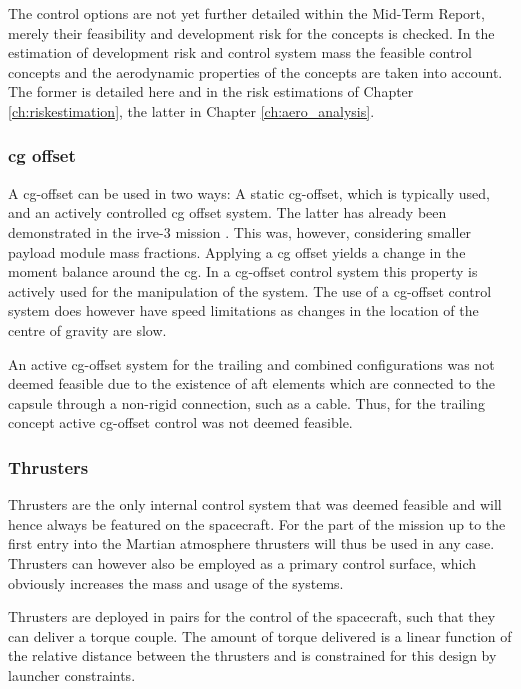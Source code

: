The control options are not yet further detailed within the Mid-Term Report, merely their feasibility and development risk for the concepts is checked. In the estimation of development risk and control system mass the feasible control concepts and the aerodynamic properties of the concepts are taken into account. The former is detailed here and in the risk estimations of Chapter \ref{ch:riskestimation}, the latter in Chapter \ref{ch:aero_analysis}.

\subsubsection{\gls{cg} offset}
A \acrfull{cg}-offset can be used in two ways: A static \gls{cg}-offset, which is typically used, and an actively controlled \gls{cg} offset system. The latter has already been demonstrated in the \gls{irve}-3 mission \cite{Dillman2012}. This was, however, considering smaller payload module mass fractions. Applying a \gls{cg} offset yields a change in the moment balance around the \gls{cg}. In a \gls{cg}-offset control system this property is actively used for the manipulation of the system. The use of a \gls{cg}-offset control system does however have speed limitations as changes in the location of the centre of gravity are slow.

An active \gls{cg}-offset system for the trailing and combined configurations was not deemed feasible due to the existence of aft elements which are connected to the capsule through a non-rigid connection, such as a cable. Thus, for the trailing concept active \gls{cg}-offset control was not deemed feasible.

\subsubsection{Thrusters}
Thrusters are the only internal control system that was deemed feasible and will hence always be featured on the spacecraft. For the part of the mission up to the first entry into the Martian atmosphere thrusters will thus be used in any case. Thrusters can however also be employed as a primary control surface, which obviously increases the mass and usage of the systems.

Thrusters are deployed in pairs for the control of the spacecraft, such that they can deliver a torque couple. The amount of torque delivered is a linear function of the relative distance between the thrusters and is constrained for this design by launcher constraints. 

